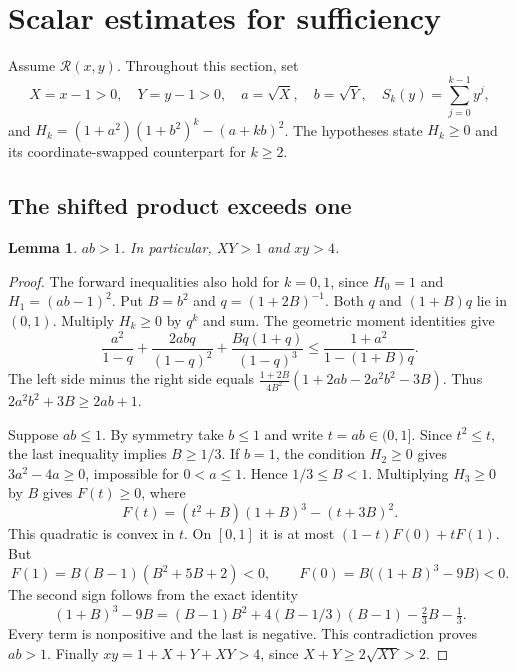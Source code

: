 \documentclass[11pt,a4paper]{article}
\newtheorem{lemma}[theorem]{Lemma}
\newcommand{\Reg}{\mathcal R}
\begin{document}
\section{Scalar estimates for sufficiency}

Assume $\Reg(x,y)$. Throughout this section, set
\[
X=x-1>0,\quad Y=y-1>0,\quad a=\sqrt X,\quad b=\sqrt Y,
\quad S_k(y)=\sum_{j=0}^{k-1}y^j,
\]
and $H_k=(1+a^2)(1+b^2)^k-(a+kb)^2$.
The hypotheses state $H_k\geq0$ and its coordinate-swapped counterpart
for $k\geq2$.

\subsection{The shifted product exceeds one}
\begin{lemma}\label{lem:product}
$ab>1$. In particular, $XY>1$ and $xy>4$.
\end{lemma}
\begin{proof}
The forward inequalities also hold for $k=0,1$, since
$H_0=1$ and $H_1=(ab-1)^2$. Put $B=b^2$ and $q=(1+2B)^{-1}$.
Both $q$ and $(1+B)q$ lie in $(0,1)$. Multiply $H_k\geq0$ by $q^k$
and sum. The geometric moment identities give
\[
\frac{a^2}{1-q}+\frac{2abq}{(1-q)^2}
+\frac{Bq(1+q)}{(1-q)^3}\leq\frac{1+a^2}{1-(1+B)q}.
\]
The left side minus the right side equals
$\frac{1+2B}{4B^2}(1+2ab-2a^2b^2-3B)$.
Thus $2a^2b^2+3B\geq2ab+1$.

Suppose $ab\leq1$. By symmetry take $b\leq1$ and write $t=ab\in(0,1]$.
Since $t^2\leq t$, the last inequality implies $B\geq1/3$.
If $b=1$, the condition $H_2\geq0$ gives $3a^2-4a\geq0$, impossible
for $0<a\leq1$. Hence $1/3\leq B<1$.
Multiplying $H_3\geq0$ by $B$ gives $F(t)\geq0$, where
\[
F(t)=(t^2+B)(1+B)^3-(t+3B)^2.
\]
This quadratic is convex in $t$. On $[0,1]$ it is at most
$(1-t)F(0)+tF(1)$. But
\[
F(1)=B(B-1)(B^2+5B+2)<0,\qquad F(0)=B\bigl((1+B)^3-9B\bigr)<0.
\]
The second sign follows from the exact identity
\[
(1+B)^3-9B=(B-1)B^2+4(B-1/3)(B-1)-\tfrac23B-\tfrac13.
\]
Every term is nonpositive and the last is negative. This contradiction
proves $ab>1$. Finally $xy=1+X+Y+XY>4$, since $X+Y\geq2\sqrt{XY}>2$.
\end{proof}
\end{document}
